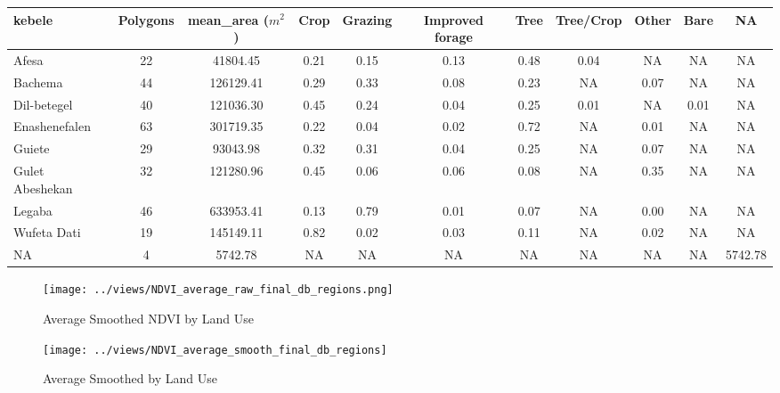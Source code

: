 \documentclass[10pt,a4paper,onecolumn]{article}
\begin{document}
\begin{table}[H]
\scriptsize
\begin{tabular}{lcccccccccc}
\toprule
kebele          & Polygons & mean\_area ($m^2$) & Crop    & Grazing & Improved forage & Tree    & Tree/Crop & Other   & Bare   & NA          \\
\midrule
Afesa           & 22       & 41804.45   & 0.21 & 0.15    & 0.13            & 0.48 & 0.04      & NA    & NA   & NA      \\
Bachema         & 44       & 126129.41  & 0.29 & 0.33    & 0.08            & 0.23 & NA        & 0.07  & NA   & NA      \\
Dil-betegel     & 40       & 121036.30  & 0.45 & 0.24    & 0.04            & 0.25 & 0.01      & NA    & 0.01 & NA      \\
Enashenefalen   & 63       & 301719.35  & 0.22 & 0.04    & 0.02            & 0.72 & NA        & 0.01  & NA   & NA      \\
Guiete          & 29       & 93043.98   & 0.32 & 0.31    & 0.04            & 0.25 & NA        & 0.07  & NA   & NA      \\
Gulet Abeshekan & 32       & 121280.96  & 0.45 & 0.06    & 0.06            & 0.08 & NA        & 0.35  & NA   & NA      \\
Legaba          & 46       & 633953.41  & 0.13 & 0.79    & 0.01            & 0.07 & NA        & 0.00  & NA   & NA      \\
Wufeta Dati     & 19       & 145149.11  & 0.82 & 0.02    & 0.03            & 0.11 & NA        & 0.02  & NA   & NA      \\
NA              & 4        & 5742.78    & NA   & NA      & NA              & NA   & NA        & NA    & NA   & 5742.78  \\

\bottomrule
\end{tabular}
\end{table}

\pagebreak

\begin{figure}[H] \centering
            \caption{Average Smoothed NDVI by Land Use}
            \captionsetup{justification=centering}
              \texttt{[image: ../views/NDVI\_average\_raw\_final\_db\_regions.png]}
              
 \end{figure}



  \begin{figure}[H] \centering
            \caption{Average Smoothed by Land Use}
            \captionsetup{justification=centering}
              \texttt{[image: ../views/NDVI\_average\_smooth\_final\_db\_regions]}
              
 \end{figure}
\end{document}
